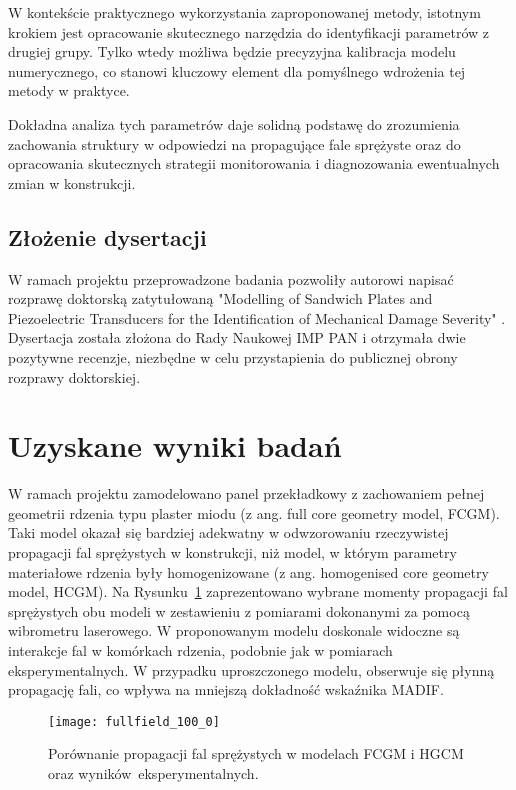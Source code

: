 \documentclass[a4paper,11pt]{article}
\begin{document}
W kontekście praktycznego wykorzystania zaproponowanej metody, istotnym krokiem jest opracowanie skutecznego narzędzia do identyfikacji parametrów z drugiej grupy. Tylko wtedy możliwa będzie precyzyjna kalibracja modelu numerycznego, co stanowi kluczowy element dla pomyślnego wdrożenia tej metody w praktyce.

Dokładna analiza tych parametrów daje solidną podstawę do zrozumienia zachowania struktury w odpowiedzi na propagujące fale sprężyste oraz do opracowania skutecznych strategii monitorowania i diagnozowania ewentualnych zmian w konstrukcji.

\subsection{Złożenie dysertacji}
W ramach projektu przeprowadzone badania pozwoliły autorowi napisać rozprawę doktorską zatytułowaną "Modelling of Sandwich Plates and Piezoelectric Transducers for the Identification of Mechanical Damage Severity" \cite{fiborek2023modelling}. 
Dysertacja została złożona do Rady Naukowej IMP PAN i otrzymała dwie pozytywne recenzje, niezbędne w celu przystapienia do publicznej obrony rozprawy doktorskiej.

\section{Uzyskane wyniki badań}
W ramach projektu zamodelowano panel przekładkowy z zachowaniem pełnej geometrii rdzenia typu plaster miodu (z ang. full core geometry model, FCGM). Taki model okazał się bardziej adekwatny w odwzorowaniu rzeczywistej propagacji fal sprężystych w konstrukcji, niż model, w którym parametry materiałowe rdzenia były homogenizowane (z ang. homogenised core geometry model, HCGM). Na Rysunku~\ref{fig:fullfield} zaprezentowano wybrane momenty propagacji fal sprężystych obu modeli w zestawieniu z pomiarami dokonanymi za pomocą wibrometru laserowego. W proponowanym modelu doskonale widoczne są interakcje fal w komórkach rdzenia, podobnie jak w pomiarach eksperymentalnych. W przypadku uproszczonego modelu, obserwuje się płynną propagację fali, co wpływa na mniejszą dokładność wskaźnika MADIF.

\begin{figure}[ht]
	\centering
	\captionsetup{width=.9\textwidth}
	\texttt{[image: fullfield\_100\_0]}
	\caption{Porównanie propagacji fal sprężystych w modelach FCGM i HGCM oraz wyników~eksperymentalnych.}
	\label{fig:fullfield}
\end{figure}
\end{document}
